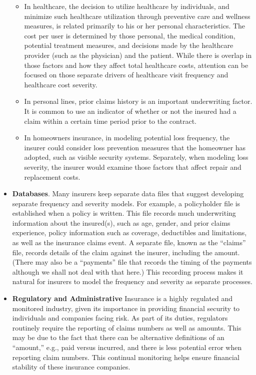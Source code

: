 \documentclass[]{book}
\providecommand{\tightlist}{%
  \setlength{\itemsep}{0pt}\setlength{\parskip}{0pt}}
\theoremstyle{definition}
\theoremstyle{definition}
\theoremstyle{definition}
\theoremstyle{remark}
\begin{document}
\begin{itemize}
  \begin{itemize}
  \tightlist
  \item
    In healthcare, the decision to utilize healthcare by individuals,
    and minimize such healthcare utilization through preventive care and
    wellness measures, is related primarily to his or her personal
    characteristics. The cost per user is determined by those personal,
    the medical condition, potential treatment measures, and decisions
    made by the healthcare provider (such as the physician) and the
    patient. While there is overlap in those factors and how they affect
    total healthcare costs, attention can be focused on those separate
    drivers of healthcare visit frequency and healthcare cost severity.
  \item
    In personal lines, prior claims history is an important underwriting
    factor. It is common to use an indicator of whether or not the
    insured had a claim within a certain time period prior to the
    contract.
  \item
    In homeowners insurance, in modeling potential loss frequency, the
    insurer could consider loss prevention measures that the homeowner
    has adopted, such as visible security systems. Separately, when
    modeling loss severity, the insurer would examine those factors that
    affect repair and replacement costs.
  \end{itemize}
\item
  \textbf{Databases}. Many insurers keep separate data files that
  suggest developing separate frequency and severity models. For
  example, a policyholder file is established when a policy is written.
  This file records much underwriting information about the insured(s),
  such as age, gender, and prior claims experience, policy information
  such as coverage, deductibles and limitations, as well as the
  insurance claims event. A separate file, known as the ``claims'' file,
  records details of the claim against the insurer, including the
  amount. (There may also be a ``payments'' file that records the timing
  of the payments although we shall not deal with that here.) This
  recording process makes it natural for insurers to model the frequency
  and severity as separate processes.
\item
  \textbf{Regulatory and Administrative} Insurance is a highly regulated
  and monitored industry, given its importance in providing financial
  security to individuals and companies facing risk. As part of its
  duties, regulators routinely require the reporting of claims numbers
  as well as amounts. This may be due to the fact that there can be
  alternative definitions of an ``amount,'' e.g., paid versus incurred,
  and there is less potential error when reporting claim numbers. This
  continual monitoring helps ensure financial stability of these
  insurance companies.
\end{itemize}
\end{document}
